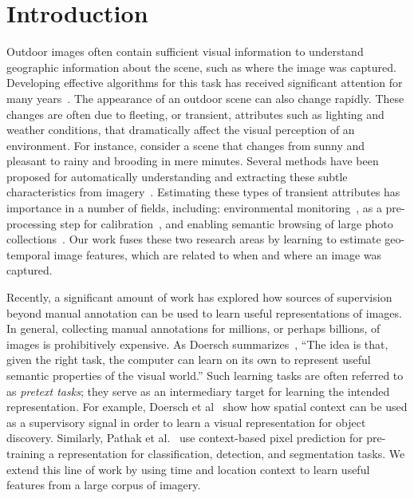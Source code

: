 \section{Introduction}

Outdoor images often contain sufficient visual information to
understand geographic information about the scene, such as where the
image was captured. Developing effective algorithms for this task has
received significant attention for many years~\cite{im2gps,planet}.
The appearance of an outdoor scene can also change rapidly. These
changes are often due to fleeting, or transient, attributes such as
lighting and weather conditions, that dramatically affect the visual
perception of an environment. For instance, consider a scene that
changes from sunny and pleasant to rainy and brooding in mere minutes.
Several methods have been proposed for automatically understanding and
extracting these subtle characteristics from
imagery~\cite{patterson2012sun,lu2014two,laffont2014transient,baltenberger16transient}.
Estimating these types of transient attributes has importance in a
number of fields, including: environmental
monitoring~\cite{wang2013observing,fedorov2014snow}, as a
pre-processing step for
calibration~\cite{jacobs13cloudcalibration,workman2014rainbow}, and
enabling semantic browsing of large photo
collections~\cite{jacobs07amos,laffont2014transient}. Our work fuses these two
research areas by learning to estimate geo-temporal image features,
which are related to when and where an image was captured.
 
Recently, a significant amount of work has explored how sources of
supervision beyond manual annotation can be used to learn useful
representations of images. In general, collecting manual annotations
for millions, or perhaps billions, of images is prohibitively
expensive. As Doersch summarizes~\cite{doersch2016supervision}, ``The
idea is that, given the right task, the computer can learn on its own
to represent useful semantic properties of the visual world.'' Such
learning tasks are often referred to as {\em pretext tasks}; they
serve as an intermediary target for learning the intended
representation.  For example, Doersch et
al~\cite{doersch2015unsupervised} show how spatial context can be used
as a supervisory signal in order to learn a visual representation for
object discovery. Similarly, Pathak et al.~\cite{pathak2016context}
use context-based pixel prediction for pre-training a representation
for classification, detection, and segmentation tasks. We extend this
line of work by using time and location context to learn useful
features from a large corpus of imagery.

